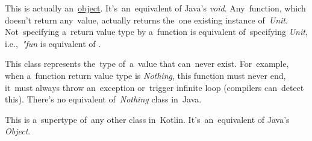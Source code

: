 
\label{kotlinunit}
This is actually an~\hyperref[kotlinobject]{object}.
It's~an~equivalent of Java's \textit{void}.
Any~function, which doesn't return any~value, actually returns the~one existing instance \mbox{of \textit{Unit}}.
Not~specifying a~return value type by a~function is equivalent of~specifying \textit{Unit}, \mbox{i.e., \textit{"fun}}  is equivalent of .

\label{kotlinnothing}
This class represents the~type of~a~value that can~never exist.
For~example, when a~function return value type is \textit{Nothing}, this function must never end, it~must always throw an~exception or~trigger infinite loop (compilers can~detect this).
There's no equivalent \mbox{of \textit{Nothing}} class in~Java.

This is a~supertype of~any other class in~Kotlin.
It's~an~equivalent of Java's \textit{Object}.
\newpage
